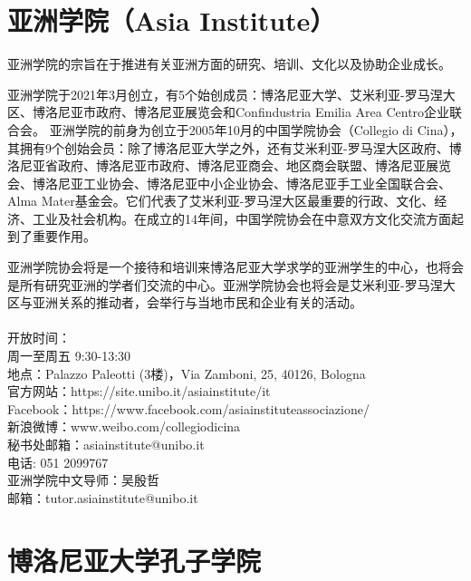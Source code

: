 \section{亚洲学院（Asia Institute）}

亚洲学院的宗旨在于推进有关亚洲方面的研究、培训、文化以及协助企业成长。

亚洲学院于2021年3月创立，有5个始创成员：博洛尼亚大学、艾米利亚-罗马涅大区、博洛尼亚市政府、博洛尼亚展览会和Confindustria Emilia Area Centro企业联合会。
亚洲学院的前身为创立于2005年10月的中国学院协会（Collegio di Cina），其拥有9个创始会员：除了博洛尼亚大学之外，还有艾米利亚-罗马涅大区政府、博洛尼亚省政府、博洛尼亚市政府、博洛尼亚商会、地区商会联盟、博洛尼亚展览会、博洛尼亚工业协会、博洛尼亚中小企业协会、博洛尼亚手工业全国联合会、Alma Mater基金会。它们代表了艾米利亚-罗马涅大区最重要的行政、文化、经济、工业及社会机构。在成立的14年间，中国学院协会在中意双方文化交流方面起到了重要作用。

亚洲学院协会将是一个接待和培训来博洛尼亚大学求学的亚洲学生的中心，也将会是所有研究亚洲的学者们交流的中心。亚洲学院协会也将会是艾米利亚-罗马涅大区与亚洲关系的推动者，会举行与当地市民和企业有关的活动。
\\
\\
\noindent 
开放时间：\\
周一至周五  9:30-13:30\\
地点：Palazzo Paleotti (3楼)，Via Zamboni, 25, 40126, Bologna\\
官方网站：https://site.unibo.it/asiainstitute/it\\
Facebook：https://www.facebook.com/asiainstituteassociazione/\\
新浪微博：www.weibo.com/collegiodicina\\
秘书处邮箱：asiainstitute@unibo.it\\
电话: 051 2099767 \\
亚洲学院中文导师：吴殷哲\\
邮箱：tutor.asiainstitute@unibo.it\\
\section{博洛尼亚大学孔子学院}

